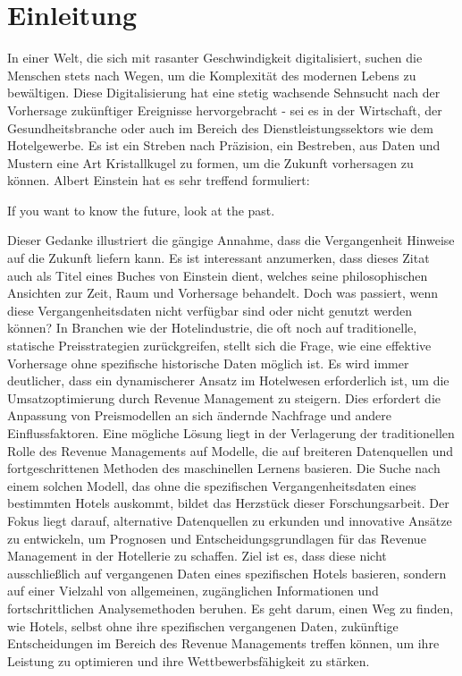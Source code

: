 \chapter{Einleitung}
\label{chap:einleitung}
In einer Welt, die sich mit rasanter Geschwindigkeit digitalisiert, suchen die Menschen stets nach Wegen, um die Komplexität des modernen Lebens zu bewältigen. Diese Digitalisierung hat eine stetig wachsende Sehnsucht nach der Vorhersage zukünftiger Ereignisse hervorgebracht - sei es in der Wirtschaft, der Gesundheitsbranche oder auch im Bereich des Dienstleistungssektors wie dem Hotelgewerbe. Es ist ein Streben nach Präzision, ein Bestreben, aus Daten und Mustern eine Art Kristallkugel zu formen, um die Zukunft vorhersagen zu können.
\newline
\newline
Albert Einstein hat es sehr treffend formuliert: 
\begin{zitat}
    If you want to know the future, look at the past. \cite{AE_zitat}
\end{zitat}
Dieser Gedanke illustriert die gängige Annahme, dass die Vergangenheit Hinweise auf die Zukunft liefern kann. Es ist interessant anzumerken, dass dieses Zitat auch als Titel eines Buches von Einstein dient, welches seine philosophischen Ansichten zur Zeit, Raum und Vorhersage behandelt.
\newline
\newline
Doch was passiert, wenn diese Vergangenheitsdaten nicht verfügbar sind oder nicht genutzt werden können? In Branchen wie der Hotelindustrie, die oft noch auf traditionelle, statische Preisstrategien zurückgreifen, stellt sich die Frage, wie eine effektive Vorhersage ohne spezifische historische Daten möglich ist. 
\newline
\newline
Es wird immer deutlicher, dass ein dynamischerer Ansatz im Hotelwesen erforderlich ist, um die Umsatzoptimierung durch Revenue Management zu steigern. Dies erfordert die Anpassung von Preismodellen an sich ändernde Nachfrage und andere Einflussfaktoren. Eine mögliche Lösung liegt in der Verlagerung der traditionellen Rolle des Revenue Managements auf Modelle, die auf breiteren Datenquellen und fortgeschrittenen Methoden des maschinellen Lernens basieren.
\newline 
\newline
Die Suche nach einem solchen Modell, das ohne die spezifischen Vergangenheitsdaten eines bestimmten Hotels auskommt, bildet das Herzstück dieser Forschungsarbeit. Der Fokus liegt darauf, alternative Datenquellen zu erkunden und innovative Ansätze zu entwickeln, um Prognosen und Entscheidungsgrundlagen für das Revenue Management in der Hotellerie zu schaffen. Ziel ist es, dass diese nicht ausschließlich auf vergangenen Daten eines spezifischen Hotels basieren, sondern auf einer Vielzahl von allgemeinen, zugänglichen Informationen und fortschrittlichen Analysemethoden beruhen. Es geht darum, einen Weg zu finden, wie Hotels, selbst ohne ihre spezifischen vergangenen Daten, zukünftige Entscheidungen im Bereich des Revenue Managements treffen können, um ihre Leistung zu optimieren und ihre Wettbewerbsfähigkeit zu stärken.


